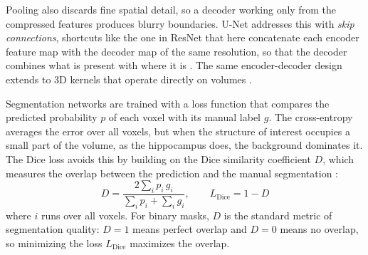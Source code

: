 Pooling also discards fine spatial detail, so a decoder working only from the compressed features produces blurry boundaries. U-Net addresses this with \emph{skip connections}, shortcuts like the one in ResNet that here concatenate each encoder feature map with the decoder map of the same resolution, so that the decoder combines what is present with where it is \parencite{ronneberger2015unet}. The same encoder-decoder design extends to 3D kernels that operate directly on volumes \parencite{milletari2016vnet}.

Segmentation networks are trained with a loss function that compares the predicted probability $p$ of each voxel with its manual label $g$. The cross-entropy averages the error over all voxels, but when the structure of interest occupies a small part of the volume, as the hippocampus does, the background dominates it. The Dice loss avoids this by building on the Dice similarity coefficient $D$, which measures the overlap between the prediction and the manual segmentation \parencite{milletari2016vnet}:
\begin{equation}
  D = \frac{2\sum_{i} p_i\, g_i}{\sum_{i} p_i + \sum_{i} g_i},
  \qquad
  L_{\mathrm{Dice}} = 1 - D
  \label{eq:dice}
\end{equation}
where $i$ runs over all voxels. For binary masks, $D$ is the standard metric of segmentation quality: $D = 1$ means perfect overlap and $D = 0$ means no overlap, so minimizing the loss $L_{\mathrm{Dice}}$ maximizes the overlap.
